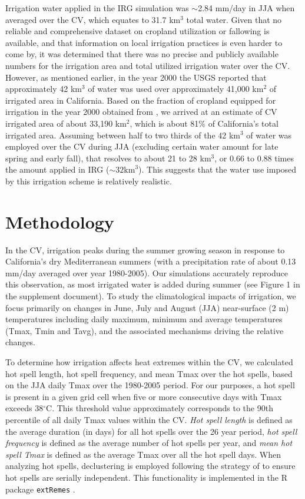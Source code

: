 \documentclass[draft,ms]{agutex}   %
\begin{document}
\begin{article}
Irrigation water applied in the IRG simulation was $\sim$2.84 mm/day in JJA when averaged over the CV, which equates to 31.7 km$^3$ total water. Given that no reliable and comprehensive dataset on cropland utilization or fallowing is available, and that information on local irrigation practices is even harder to come by, it was determined that there was no precise and publicly available numbers for the irrigation area and total utilized irrigation water over the CV. However, as mentioned earlier, in the year 2000 the USGS reported that approximately 42 km$^3$ of water was used over approximately 41,000 km$^2$ of irrigated area in California. Based on the fraction of cropland equipped for irrigation in the year 2000 obtained from \citet{siebert2005development}, we arrived at an estimate of CV irrigated area of about 33,190 km$^2$, which is about 81$\%$ of California's total irrigated area.  Assuming between half to two thirds of the 42 km$^3$ of water was employed over the CV during JJA (excluding certain water amount for late spring and early fall), that resolves to about 21 to 28 km$^3$, or 0.66 to 0.88 times the amount applied in IRG ($\sim32 \mbox{km}^3$). This suggests that the water use imposed by this irrigation scheme is relatively realistic.


\section{Methodology}

In the CV, irrigation peaks during the summer growing season \citep{salas2006estimating} in response to California's dry Mediterranean summers (with a precipitation rate of about 0.13 mm/day averaged over year 1980-2005). Our simulations accurately reproduce this observation, as most irrigated water is added during summer (see Figure 1 in the supplement document). To study the  climatological impacts of irrigation, we focus primarily on changes in June, July and August (JJA) near-surface (2 m) temperatures including daily maximum, minimum and average temperatures (Tmax, Tmin and Tavg), and the associated mechanisms driving the relative changes. 

To determine how irrigation affects heat extremes within the CV, we calculated hot spell length, hot spell frequency, and mean Tmax over the hot spells, based on the JJA daily Tmax over the 1980-2005 period. For our purposes, a hot spell is present in a given grid cell when five or more consecutive days with Tmax exceeds 38$^\circ$C. This threshold value approximately corresponds to the 90th percentile of all daily Tmax values within the CV. \textit{Hot spell length} is defined as the average duration (in days) for all  hot spells over the 26 year period, \textit{hot spell frequency} is defined as the average number of hot spells per year, and \textit{mean hot spell Tmax} is defined as the average Tmax over all the hot spell days. When analyzing hot spells, declustering is employed following the strategy of \cite{ferro2003inference} to ensure hot spells are serially independent.  This functionality is implemented in the R package \texttt{extRemes} \citep{gilleland2011new}.


\end{article}
\end{document}
